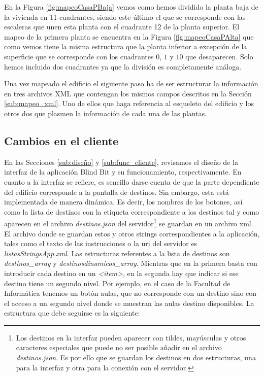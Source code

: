 En la Figura \ref{fig:mapeoCasaPBaja} vemos como hemos dividido la planta baja de la vivienda en 11 cuadrantes, siendo este último el que se corresponde con las escaleras que unen esta planta con el cuadrante 12 de la planta superior. El mapeo de la primera planta se encuentra en la Figura \ref{fig:mapeoCasaPAlta} que como vemos tiene la misma estructura que la planta inferior a excepción de la superficie que se corresponde con los cuadrantes $0$, $1$ y $10$ que desaparecen. Solo hemos incluido dos cuadrantes ya que la división es completamente análoga.

Una vez mapeado el edificio el siguiente paso ha de ser estructurar la información en tres archivos XML que contengan los mismos campos descritos en la Sección \ref{sub:mapeo_xml}. Uno de ellos que haga referencia al esqueleto del edificio y los otros dos que plasmen la información de cada una de las plantas. %



\subsection{Cambios en el cliente}
\label{sub:cambiosCliente_vivienda}

En las Secciones \ref{sub:diseño} y \ref{sub:func_cliente}, revisamos el diseño de la interfaz de la aplicación Blind Bit y su funcionamiento, respectivamente. En cuanto a la interfaz se refiere, es sencillo darse cuenta de que la parte dependiente del edificio corresponde a la pantalla de destinos. Sin embargo, esta está implementada de manera dinámica. Es decir, los nombres de los botones, así como la lista de destinos con la etiqueta correspondiente a los destinos tal y como aparecen en el archivo \textit{destinos.json} del servidor\footnote{Los destinos en la interfaz pueden aparecer con tildes, mayúsculas y otros caracteres especiales que puede no ser posible añadir en el archivo \textit{destinos.json}. Es por ello que se guardan los destinos en dos estructuras, una para la interfaz y otra para la conexión con el servidor.} se guardan en un archivo xml. El archivo donde se guardan estos y otros strings correspondientes a la aplicación, tales como el texto de las instrucciones o la uri del servidor es \textit{listasStringsApp.xml}. Las estructuras referentes a la lista de destinos son \textit{destinos\_array} y \textit{destinosdinamicos\_array}. Mientras que en la primera basta con introducir cada destino en un \textit{<item>}, en la segunda hay que indicar si ese destino tiene un segundo nivel. Por ejemplo, en el caso de la Facultad de Informática tenemos un botón aulas, que no corresponde con un destino sino con el acceso a un segundo nivel donde se muestran las aulas destino disponibles. La estructura que debe seguirse es la siguiente: 


